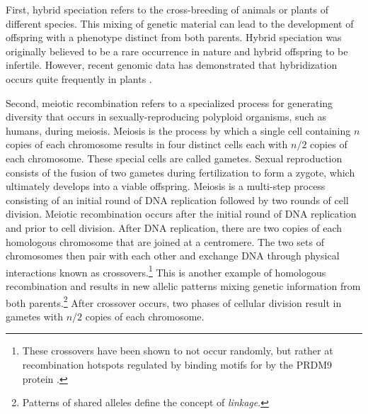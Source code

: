 First, hybrid speciation refers to the cross-breeding of animals or plants of different species.
This mixing of genetic material can lead to the development of offspring with a phenotype distinct from both parents.
Hybrid speciation was originally believed to be a rare occurrence in nature and hybrid offspring to be infertile.
However, recent genomic data has demonstrated that hybridization occurs quite frequently in plants \cite{Arnold:1996,Arnold:2007vq}.

Second, meiotic recombination refers to a specialized process for generating diversity that occurs in sexually-reproducing polyploid organisms, such as humans, during meiosis.
Meiosis is the process by which a single cell containing $n$ copies of each chromosome results in four distinct cells each with $n/2$ copies of each chromosome.
These special cells are called gametes.
Sexual reproduction consists of the fusion of two gametes during fertilization to form a zygote, which ultimately develops into a viable offspring.
Meiosis is a multi-step process consisting of an initial round of DNA replication followed by two rounds of cell division.
Meiotic recombination occurs after the initial round of DNA replication and prior to cell division.
After DNA replication, there are two copies of each homologous chromosome that are joined at a centromere.
The two sets of chromosomes then pair with each other and exchange DNA through physical interactions known as crossovers.\footnote{These crossovers have been shown to not occur randomly, but rather at recombination hotspots regulated by binding motifs for by the PRDM9 protein \cite{Baudat:2010ii,Camara:2016}.}
This is another example of homologous recombination and results in new allelic patterns mixing genetic information from both parents.\footnote{Patterns of shared alleles define the concept of \emph{linkage}.}
After crossover occurs, two phases of cellular division result in gametes with $n/2$ copies of each chromosome.



